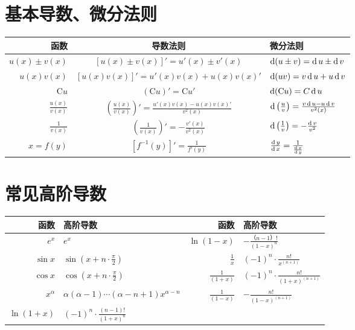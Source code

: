 \newpage
\section{基本导数、微分法则}
  \begin{tabular}{r @{\qquad} c @{\qquad} l}
  \toprule[1pt]
    函数 & 导数法则 & 微分法则\\
  \midrule[0.5pt]
    $u(x) \pm v(x)$ & $\left[ u(x) \pm v(x) \right]' = u'(x) \pm v'(x)$ & $\operatorname{\mathop{}\!\mathrm{d}} (u \pm v) = \operatorname{\mathop{}\!\mathrm{d}} u \pm \operatorname{\mathop{}\!\mathrm{d}} v$\\
    $u(x)v(x)$ & $\left[ u(x)v(x) \right]' = u'(x)v(x) + u(x)v(x)'$ & $\operatorname{\mathop{}\!\mathrm{d}} (uv) = v \operatorname{\mathop{}\!\mathrm{d}} u + u \operatorname{\mathop{}\!\mathrm{d}} v$\\
    $\mathrm{C}u$ & $(\mathrm{C}u)' = \mathrm{C}u'$ & $\operatorname{\mathop{}\!\mathrm{d}} (\mathrm{C}u) = C\operatorname{\mathop{}\!\mathrm{d}} u$\\
    $\frac{u(x)}{v(x)}$ & $\left( \frac{u(x)}{v(x)} \right)' = \frac{u'(x)v(x) - u(x)v(x)'}{v^2(x)}$ & $\operatorname{\mathop{}\!\mathrm{d}} \left( \frac{u}{v} \right) = \frac{v \operatorname{\mathop{}\!\mathrm{d}} u - u \operatorname{\mathop{}\!\mathrm{d}} v}{v^2(x)}$\\
    $\frac{1}{v(x)}$ & $\left( \frac{1}{v(x)} \right)' = - \frac{v'(x)}{v^2(x)}$ & $\operatorname{\mathop{}\!\mathrm{d}} \left( \frac{1}{v} \right) = - \frac{\operatorname{\mathop{}\!\mathrm{d}} v}{v^2}$\\
    $x=f(y)$ & $\left[ f^{-1}(y) \right]' = \frac{1}{f'(y)}$ & $\frac{\operatorname{\mathop{}\!\mathrm{d}} y}{\operatorname{\mathop{}\!\mathrm{d}} x} = \frac{1}{\frac{\operatorname{\mathop{}\!\mathrm{d}} x}{\operatorname{\mathop{}\!\mathrm{d}} y}}$\\
  \bottomrule[1pt]
  \end{tabular}

\section{常见高阶导数}
  \begin{tabular}{r @{\qquad} l @{\qquad} r @{\qquad} l}
  \toprule[1pt]
    函数 & 高阶导数 & 函数 & 高阶导数 \\
  \midrule[0.5pt]
    $e^x$ & $e^x$ & $\ln (1-x)$ & $- \frac{（n-1）\mathrm{!}}{(1-x)^n}$\\
    $\sin x$ & $\sin (x + n \cdot \frac{\pi}{2})$ & $\frac{1}{x}$ & $(-1)^n \cdot \frac{n\mathrm{!}}{x^(n+1)}$\\
    $\cos x$ & $\cos (x + n \cdot \frac{\pi}{2})$ & $\frac{1}{(1+x)}$ & $(-1)^n \cdot \frac{n\mathrm{!}}{(1+x)^(n+1)}$\\
    $x^\alpha$ & $\alpha(\alpha-1)\cdots(\alpha-n+1)x^{\alpha-n}$ & $\frac{1}{(1-x)}$ & $- \frac{n\mathrm{!}}{(1-x)^(n+1)}$\\
    $\ln (1+x)$ & $(-1)^n \cdot \frac{(n-1)\mathrm{!}}{(1+x)^n}$\\
  \bottomrule[1pt]
  \end{tabular}


